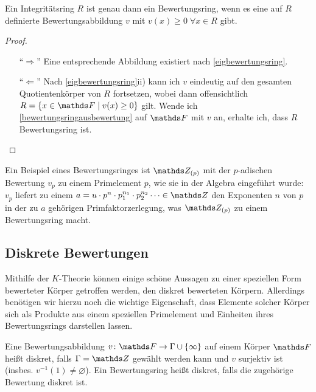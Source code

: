 \documentclass[ngerman,fontsize=11pt, paper=a4, parskip=half, titlepage=true, toc=bib]{scrartcl}
\begin{document}
\begin{Kor}
  Ein Integritätsring $R$ ist genau dann ein Bewertungsring, wenn es
  eine auf $R$ definierte Bewertungsabbildung $v$ mit $v(x)\geq
  0\;\forall x\in R$ gibt.
  \begin{proof}
    \begin{itemize}
    \item[\enquote{$\Rightarrow$}] Eine entsprechende Abbildung
      existiert nach \ref{eigbewertungsring}.
    \item[\enquote{$\Leftarrow$}] Nach \ref{eigbewertungsring}ii)
      kann ich $v$ eindeutig auf den gesamten Quotientenkörper von
      $R$ fortsetzen, wobei dann offensichtlich $R=\{x\in\F\mid
      v(x)\geq 0\}$ gilt. Wende ich \ref{bewertungsringausbewertung}
      auf $\F$ mit $v$ an, erhalte ich, dass $R$ Bewertungsring ist.
    \end{itemize}
  \end{proof}
\end{Kor}

\begin{Bsp}
  Ein Beispiel eines Bewertungsringes ist $\Z_{(p)}$ mit der $p$-adischen
  Bewertung $v_p$ zu einem Primelement $p$, 
  wie sie in der Algebra eingeführt wurde: 
  $v_p$ liefert zu einem 
  $a=u\cdot p^{n}\cdot p_1^{n_1}\cdot p_2^{n_2}\dotsm\in\Z $ 
  den Exponenten $n$ von $p$ in der zu $a$ gehörigen Primfaktorzerlegung,
  was $\Z_{(p)}$ zu einem Bewertungsring macht.
\end{Bsp}

\subsection{Diskrete Bewertungen}
Mithilfe der $K$-Theorie können einige schöne Aussagen zu einer
speziellen Form bewerteter Körper getroffen werden, den diskret
bewerteten Körpern. Allerdings benötigen wir hierzu noch die wichtige
Eigenschaft, dass Elemente solcher Körper sich als Produkte aus einem speziellen
Primelement und Einheiten ihres Bewertungsrings darstellen lassen.

\begin{Def}
  Eine Bewertungsabbildung $v\colon\F\to\Gamma\cup\{\infty\}$
  auf einem Körper $\F$ heißt diskret, falls $\Gamma=\Z$ gewählt
  werden kann und $v$ surjektiv ist (insbes. $v^{-1}(1)\neq \varnothing$).
  Ein Bewertungsring heißt diskret, falls die zugehörige Bewertung
  diskret ist.
\end{Def}
\end{document}
